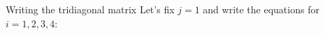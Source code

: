 \documentclass{beamer}
\begin{document}
\begin{frame}{Writing the tridiagonal matrix}
    \vspace{-0.8cm}   
    Let's fix $j = 1$ and write the equations for $i =  1, 2, 3, 4$:
    
    \begin{columns}
        \begin{column}{0.3\textwidth}
            \begin{minipage}{0.2\textwidth}
\end{minipage}
\end{column}
\end{columns}
\end{frame}
\end{document}
